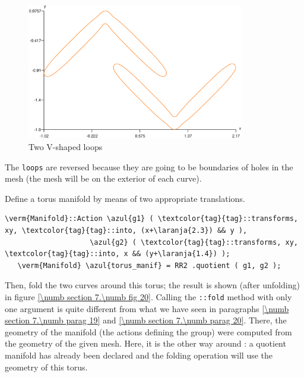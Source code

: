 \begin{figure}[ht] \centering
  \includegraphics[width=95mm]{boomerang-1.eps}
  \caption{Two V-shaped loops}
  \label{\numb section 7.\numb fig 19}
\end{figure}

The {\small\tt loops} are reversed because they are going to be boundaries of holes
in the mesh (the mesh will be on the exterior of each curve).
\vfil\eject

Define a torus manifold by means of two appropriate translations.

\begin{Verbatim}[commandchars=\\\{\},formatcom=\small\tt,frame=single,
   rulecolor=\color{moldura},baselinestretch=0.94,framesep=2mm         ]
   \verm{Manifold}::Action \azul{g1} ( \textcolor{tag}{tag}::transforms, xy, \textcolor{tag}{tag}::into, (x+\laranja{2.3}) && y ),
                    \azul{g2} ( \textcolor{tag}{tag}::transforms, xy, \textcolor{tag}{tag}::into, x && (y+\laranja{1.4}) );
   \verm{Manifold} \azul{torus_manif} = RR2 .quotient ( g1, g2 );
\end{Verbatim}

\vskip -2mm
Then, fold the two curves around this torus; the result is shown (after unfolding) in figure
\ref{\numb section 7.\numb fig 20}.
Calling the {\small\tt{}::fold} method with only one argument is quite different
from what we have seen in paragraphs \ref{\numb section 7.\numb parag 19} and
\ref{\numb section 7.\numb parag 20}.
There, the geometry of the manifold (the actions defining the group) were computed from
the geometry of the given mesh.
Here, it is the other way around : a quotient manifold has already been declared and
the folding operation will use the geometry of this torus.

